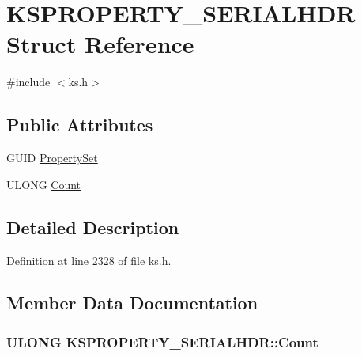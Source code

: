 \hypertarget{struct_k_s_p_r_o_p_e_r_t_y___s_e_r_i_a_l_h_d_r}{}\section{K\+S\+P\+R\+O\+P\+E\+R\+T\+Y\+\_\+\+S\+E\+R\+I\+A\+L\+H\+DR Struct Reference}
\label{struct_k_s_p_r_o_p_e_r_t_y___s_e_r_i_a_l_h_d_r}


{\ttfamily \#include $<$ks.\+h$>$}

\subsection*{Public Attributes}
\begin{DoxyCompactItemize}
\item 
G\+U\+ID \hyperlink{struct_k_s_p_r_o_p_e_r_t_y___s_e_r_i_a_l_h_d_r_a3381c08110f488b315426206ad638523}{Property\+Set}
\item 
U\+L\+O\+NG \hyperlink{struct_k_s_p_r_o_p_e_r_t_y___s_e_r_i_a_l_h_d_r_af9b04e70162c00ec83064e3d9f15bb9c}{Count}
\end{DoxyCompactItemize}


\subsection{Detailed Description}


Definition at line 2328 of file ks.\+h.



\subsection{Member Data Documentation}
\subsubsection[{\texorpdfstring{Count}{Count}}]{\setlength{\rightskip}{0pt plus 5cm}U\+L\+O\+NG K\+S\+P\+R\+O\+P\+E\+R\+T\+Y\+\_\+\+S\+E\+R\+I\+A\+L\+H\+D\+R\+::\+Count}\hypertarget{struct_k_s_p_r_o_p_e_r_t_y___s_e_r_i_a_l_h_d_r_af9b04e70162c00ec83064e3d9f15bb9c}{}\label{struct_k_s_p_r_o_p_e_r_t_y___s_e_r_i_a_l_h_d_r_af9b04e70162c00ec83064e3d9f15bb9c}



